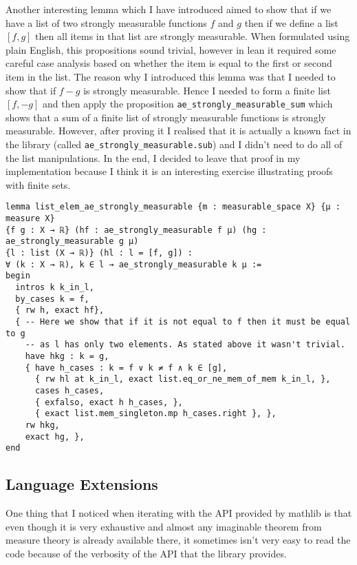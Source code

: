 \documentclass[11pt]{article}
\newenvironment{code}{\captionsetup{type=listing}}{}
\begin{document}
Another interesting lemma which I have introduced aimed to show that if we have
a list of two strongly measurable functions $f$ and  $g$ then if we define a list
$[f, g]$ then all items in that list are strongly measurable. When formulated using
plain English, this propositions sound trivial, however in lean it required some
careful case analysis based on whether the item is equal to the first or second
item in the list. The reason why I introduced this lemma was that I needed to show
that if $f - g$ is strongly
measurable. Hence I needed to form a finite list $[f, -g]$ and then apply the
proposition \texttt{ae\_strongly\_measurable\_sum}  which shows that a sum of a finite
list of strongly measurable functions is strongly measurable. However,
after proving it I realised that it is actually a known fact in the
library (called \texttt{ae\_strongly\_measurable.sub}) and I didn't need to do
all of the list manipulations. In the end, I decided to leave that proof in my implementation
because I think it is an interesting exercise illustrating proofs with finite sets.
\begin{code}
\begin{verbatim}
lemma list_elem_ae_strongly_measurable {m : measurable_space X} {μ : measure X}
{f g : X → ℝ} (hf : ae_strongly_measurable f μ) (hg : ae_strongly_measurable g μ)
{l : list (X → ℝ)} (hl : l = [f, g]) :
∀ (k : X → ℝ), k ∈ l → ae_strongly_measurable k μ :=
begin
  intros k k_in_l,
  by_cases k = f,
  { rw h, exact hf},
  { -- Here we show that if it is not equal to f then it must be equal to g
    -- as l has only two elements. As stated above it wasn't trivial.
    have hkg : k = g,
    { have h_cases : k = f ∨ k ≠ f ∧ k ∈ [g],
      { rw hl at k_in_l, exact list.eq_or_ne_mem_of_mem k_in_l, },
      cases h_cases,
      { exfalso, exact h h_cases, },
      { exact list.mem_singleton.mp h_cases.right }, },
    rw hkg,
    exact hg, },
end
\end{verbatim}
\end{code}

\subsection*{Language Extensions}

One thing that I noticed when iterating with the API provided by mathlib is that
even though it is very exhaustive and almost any imaginable theorem from measure
theory is already available there, it sometimes isn't very easy to read
the code because of the verbosity of the API that the library provides.
\end{document}
